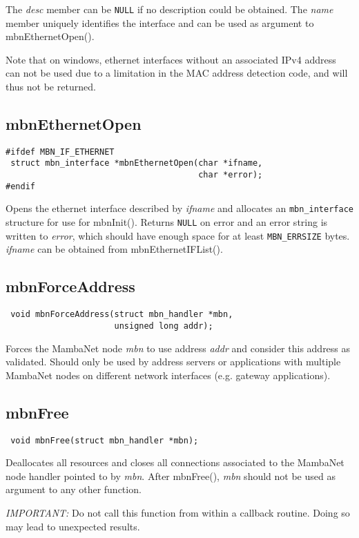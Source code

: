 The \textit{desc} member can be \verb|NULL| if no description could be obtained. The \textit{name} member uniquely identifies the interface and can be used as argument to mbnEthernetOpen().

Note that on windows, ethernet interfaces without an associated IPv4 address can not be used due to a limitation in the MAC address detection code, and will thus not be returned.


\subsection{mbnEthernetOpen}
\begin{verbatim}
#ifdef MBN_IF_ETHERNET
 struct mbn_interface *mbnEthernetOpen(char *ifname,
                                       char *error);
#endif
\end{verbatim}
Opens the ethernet interface described by \textit{ifname} and allocates an \verb|mbn_interface| structure for use for mbnInit(). Returns \verb|NULL| on error and an error string is written to \textit{error}, which should have enough space for at least \verb|MBN_ERRSIZE| bytes. \textit{ifname} can be obtained from mbnEthernetIFList().


\subsection{mbnForceAddress}
\begin{verbatim}
 void mbnForceAddress(struct mbn_handler *mbn,
                      unsigned long addr);
\end{verbatim}
Forces the MambaNet node \textit{mbn} to use address \textit{addr} and consider this address as validated. Should only be used by address servers or applications with multiple MambaNet nodes on different network interfaces (e.g. gateway applications).


\subsection{mbnFree}
\begin{verbatim}
 void mbnFree(struct mbn_handler *mbn);
\end{verbatim}
Deallocates all resources and closes all connections associated to the MambaNet node handler pointed to by \textit{mbn}. After mbnFree(), \textit{mbn} should not be used as argument to any other function.

\emph{IMPORTANT:} Do not call this function from within a callback routine. Doing so may lead to unexpected results.

